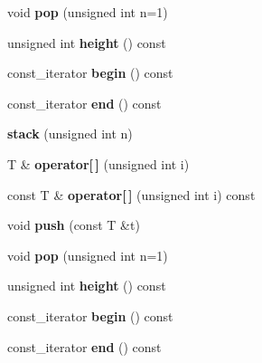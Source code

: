 \begin{DoxyCompactItemize}
\item 
\hypertarget{classyy_1_1stack_a0800c0a796cade80c3ce9a785dc87564}{void {\bfseries pop} (unsigned int n=1)}\label{classyy_1_1stack_a0800c0a796cade80c3ce9a785dc87564}

\item 
\hypertarget{classyy_1_1stack_a968303842836fd4e9e3994a4e3984191}{unsigned int {\bfseries height} () const }\label{classyy_1_1stack_a968303842836fd4e9e3994a4e3984191}

\item 
\hypertarget{classyy_1_1stack_a3939df081955a4ad78e14eeb9b2b5dbf}{const\-\_\-iterator {\bfseries begin} () const }\label{classyy_1_1stack_a3939df081955a4ad78e14eeb9b2b5dbf}

\item 
\hypertarget{classyy_1_1stack_a27ade5b933a4dc8a27960c88addda2a0}{const\-\_\-iterator {\bfseries end} () const }\label{classyy_1_1stack_a27ade5b933a4dc8a27960c88addda2a0}

\item 
\hypertarget{classyy_1_1stack_af4277ae80177abc36f242c3646cbcfbe}{{\bfseries stack} (unsigned int n)}\label{classyy_1_1stack_af4277ae80177abc36f242c3646cbcfbe}

\item 
\hypertarget{classyy_1_1stack_a1058b8b7e1a3e0aa7b1e6f2f1a62c234}{T \& {\bfseries operator\mbox{[}$\,$\mbox{]}} (unsigned int i)}\label{classyy_1_1stack_a1058b8b7e1a3e0aa7b1e6f2f1a62c234}

\item 
\hypertarget{classyy_1_1stack_a46778e0ee1fd32a559008d5a261df098}{const T \& {\bfseries operator\mbox{[}$\,$\mbox{]}} (unsigned int i) const }\label{classyy_1_1stack_a46778e0ee1fd32a559008d5a261df098}

\item 
\hypertarget{classyy_1_1stack_a5ff563955472eca36f73f6e840df2963}{void {\bfseries push} (const T \&t)}\label{classyy_1_1stack_a5ff563955472eca36f73f6e840df2963}

\item 
\hypertarget{classyy_1_1stack_a0800c0a796cade80c3ce9a785dc87564}{void {\bfseries pop} (unsigned int n=1)}\label{classyy_1_1stack_a0800c0a796cade80c3ce9a785dc87564}

\item 
\hypertarget{classyy_1_1stack_a968303842836fd4e9e3994a4e3984191}{unsigned int {\bfseries height} () const }\label{classyy_1_1stack_a968303842836fd4e9e3994a4e3984191}

\item 
\hypertarget{classyy_1_1stack_a3939df081955a4ad78e14eeb9b2b5dbf}{const\-\_\-iterator {\bfseries begin} () const }\label{classyy_1_1stack_a3939df081955a4ad78e14eeb9b2b5dbf}

\item 
\hypertarget{classyy_1_1stack_a27ade5b933a4dc8a27960c88addda2a0}{const\-\_\-iterator {\bfseries end} () const }\label{classyy_1_1stack_a27ade5b933a4dc8a27960c88addda2a0}

\end{DoxyCompactItemize}
